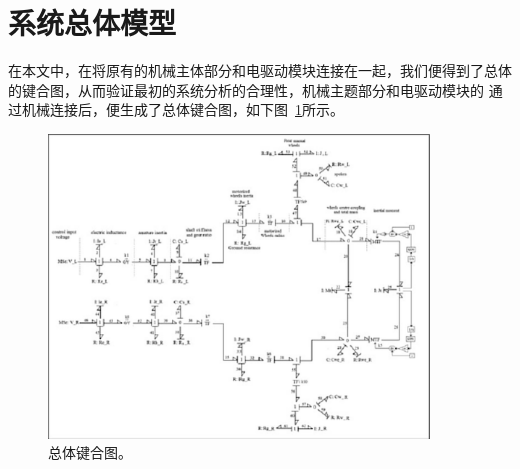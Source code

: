 \newpage
\section{系统总体模型}

在本文中，在将原有的机械主体部分和电驱动模块连接在一起，我们便得到了总体的键合图，从而验证最初的系统分析的合理性，机械主题部分和电驱动模块的
通过机械连接后，便生成了总体键合图，如下图~\ref{fig:overall}所示。

\begin{figure}[!h]
	\centering
	\includegraphics[width=0.9\textwidth]{fig/overallv1.png}
	\caption{总体键合图。}\label{fig:overall}
\end{figure}
